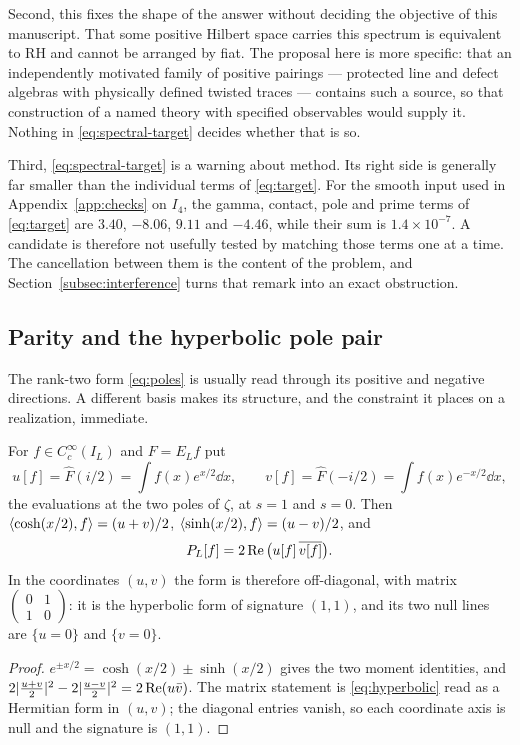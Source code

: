 Second, this fixes the shape of the answer without deciding the objective of
this manuscript. That some positive Hilbert space carries this spectrum is
equivalent to RH and cannot be arranged by fiat. The proposal here is more
specific: that an independently motivated family of positive pairings ---
protected line and defect algebras with physically defined twisted traces
--- contains such a source, so that construction of a named theory with
specified observables would supply it. Nothing in
\eqref{eq:spectral-target} decides whether that is so.

Third, \eqref{eq:spectral-target} is a warning about method. Its right side
is generally far smaller than the individual terms of \eqref{eq:target}. For
the smooth input used in Appendix~\ref{app:checks} on $I_4$, the gamma,
contact, pole and prime terms of \eqref{eq:target} are
$3.40$, $-8.06$, $9.11$ and $-4.46$, while their sum is $1.4\times10^{-7}$.
A candidate is therefore not usefully tested by matching those terms one at
a time. The cancellation between them is the content of the problem, and
Section~\ref{subsec:interference} turns that remark into an exact
obstruction.

\subsection{Parity and the hyperbolic pole pair}\label{subsec:parity}
The rank-two form \eqref{eq:poles} is usually read through its positive and
negative directions. A different basis makes its structure, and the
constraint it places on a realization, immediate.

\begin{lemma}\label{lem:polepair}
For $f\in C_c^\infty(I_L)$ and $F=E_Lf$ put
\begin{equation}\label{eq:polecoords}
 u[f]=\widehat F(i/2)=\int f(x)e^{x/2}\dd x,
 \qquad
 v[f]=\widehat F(-i/2)=\int f(x)e^{-x/2}\dd x,
\end{equation}
the evaluations at the two poles of $\zeta$, at $s=1$ and $s=0$. Then
$\langle \cosh(x/2),f\rangle=(u+v)/2$, $\langle \sinh(x/2),f\rangle=(u-v)/2$, and
\begin{equation}\label{eq:hyperbolic}
 P_L[f]=2\operatorname{Re}\big(u[f]\,\overline{v[f]}\big).
\end{equation}
In the coordinates $(u,v)$ the form is therefore off-diagonal, with matrix
$\left(\begin{smallmatrix}0&1\\1&0\end{smallmatrix}\right)$: it is the
hyperbolic form of signature $(1,1)$, and its two null lines are $\{u=0\}$
and $\{v=0\}$.
\end{lemma}
\begin{proof}
$e^{\pm x/2}=\cosh(x/2)\pm\sinh(x/2)$ gives the two moment identities, and
$2|\tfrac{u+v}2|^2-2|\tfrac{u-v}2|^2=2\operatorname{Re}(u\bar v)$. The matrix statement is
\eqref{eq:hyperbolic} read as a Hermitian form in $(u,v)$; the diagonal
entries vanish, so each coordinate axis is null and the signature is $(1,1)$.
\end{proof}

